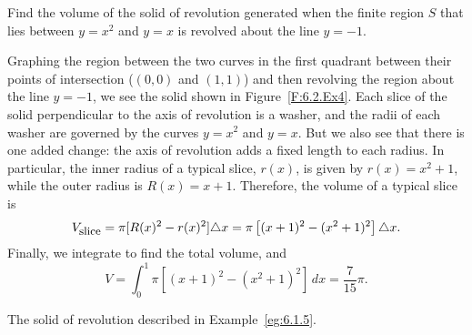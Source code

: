 \begin{example} \label{eg:6.1.5} %
Find the volume of the solid of revolution generated when the finite region $S$ that lies between $y = x^2$ and $y = x$ is revolved about the line $y = -1$.

\solution 
Graphing the region between the two curves in the first quadrant between their points of intersection ($(0,0)$ and $(1,1)$) and then revolving the region about the line $y = -1$, we see the solid shown in Figure~\ref{F:6.2.Ex4}.  Each slice of the solid perpendicular to the axis of revolution is a washer, and the radii of each washer are governed by the curves $y = x^2$ and $y = x$.  But we also see that there is one added change:  the axis of revolution adds a fixed length to each radius.  In particular, the inner radius of a typical slice, $r(x)$, is given by $r(x) = x^2 + 1$, while the outer radius is $R(x) = x+1$.  Therefore, the volume of a typical slice is
$$V_{\mbox{\small{slice}}} = \pi[ R(x)^2 - r(x)^2 ] \triangle x = \pi \left[ (x+1)^2 - (x^2 + 1)^2 \right] \triangle x.$$
Finally, we integrate to find the total volume, and 
$$V = \int_0^1  \pi \left[ (x+1)^2 - (x^2 + 1)^2 \right] \, dx = \frac{7}{15} \pi.$$
\end{example}

\begin{marginfigure}[-10cm] %
\caption{The solid of revolution described in Example~\ref{eg:6.1.5}.} \label{F:6.2.Ex4}
\end{marginfigure}

